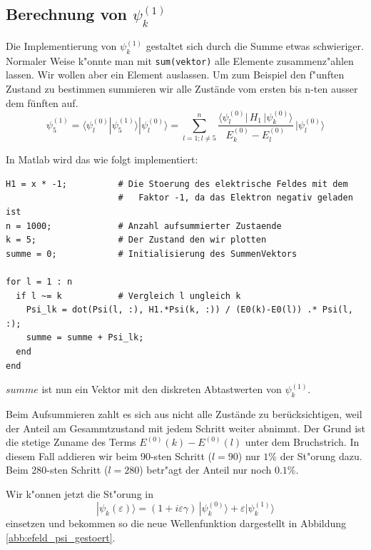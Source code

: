 \begin{refsection}
\subsection{Berechnung von $\psi_k^{(1)}$}

Die Implementierung von $\psi_k^{(1)}$ gestaltet sich durch die Summe etwas schwieriger.
Normaler Weise k"onnte man mit \verb|sum(vektor)| alle Elemente zusammenz"ahlen lassen.
Wir wollen aber ein Element auslassen. 
Um zum Beispiel den f"unften Zustand zu bestimmen summieren wir alle Zust\"ande vom 
ersten bis n-ten ausser dem f\"unften auf.
\begin{equation}
  \psi_5^{(1)} = \langle\psi_l^{(0)}|\psi_5^{(1)}\rangle|\psi_l^{(0)}\rangle = 
  \sum_{l=1 ; l\ne 5}^{n}
    \frac{\langle \psi_l^{(0)}|\, H_1 \,|\psi_k^{(0)}\rangle}{E_k^{(0)}-E_l^{(0)}}
        \,
    |\psi_l^{(0)}\rangle
\end{equation}

In Matlab wird das wie folgt implementiert:
\begin{lstlisting}[style=Matlab]
H1 = x * -1;          # Die Stoerung des elektrische Feldes mit dem
                      #   Faktor -1, da das Elektron negativ geladen ist
n = 1000;             # Anzahl aufsummierter Zustaende
k = 5;                # Der Zustand den wir plotten
summe = 0;            # Initialisierung des SummenVektors

for l = 1 : n
  if l ~= k           # Vergleich l ungleich k
    Psi_lk = dot(Psi(l, :), H1.*Psi(k, :)) / (E0(k)-E0(l)) .* Psi(l, :);
    summe = summe + Psi_lk;
  end
end
\end{lstlisting}
$summe$ ist nun ein Vektor mit den diskreten Abtastwerten von $\psi_k^{(1)}$.

Beim Aufsummieren zahlt es sich aus nicht alle Zust\"ande zu ber\"ucksichtigen, weil der Anteil am Gesammtzustand 
mit jedem Schritt weiter abnimmt. Der Grund ist die stetige Zuname des Terms 
$E^{(0)}(k)-E^{(0)}(l)$ unter dem Bruchstrich.
In diesem Fall addieren wir beim 90-sten Schritt ($l=90$) nur $1\%$ der St"orung dazu.
Beim 280-sten Schritt ($l=280$) betr"agt der Anteil nur noch $0.1\%$.

Wir k"onnen jetzt die St"orung in 
\begin{equation}
|\psi_k(\varepsilon)\rangle
=
(1+i\varepsilon \gamma)
\,|\psi_k^{(0)}\rangle
+
\varepsilon|\psi_k^{(1)}\rangle
\end{equation}
einsetzen und bekommen so die neue Wellenfunktion dargestellt in Abbildung \ref{abb:efeld_psi_gestoert}.





\end{refsection}
